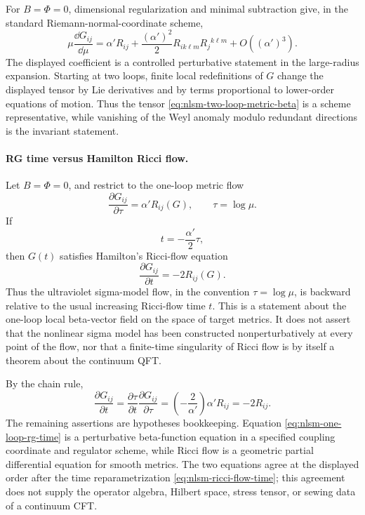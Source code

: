 \begin{controlledapproximation}
\label{capprox:nlsm-two-loop-metric-beta}
For \(B=\Phi=0\), dimensional regularization and minimal subtraction give,
in the standard Riemann-normal-coordinate scheme,
\begin{equation}
  \mu\frac{\dd G_{ij}}{\dd\mu}
  =
  \alpha' R_{ij}
  +
  \frac{(\alpha')^2}{2}
  R_{ik\ell m}R_j{}^{k\ell m}
  +
  O((\alpha')^3).
  \label{eq:nlsm-two-loop-metric-beta}
\end{equation}
The displayed coefficient is a controlled perturbative statement in the
large-radius expansion.  Starting at two loops, finite local redefinitions
of \(G\) change the displayed tensor by Lie derivatives and by terms
proportional to lower-order equations of motion.  Thus the tensor
\eqref{eq:nlsm-two-loop-metric-beta} is a scheme representative, while
vanishing of the Weyl anomaly modulo redundant directions is the invariant
statement.
\end{controlledapproximation}

\paragraph{RG time versus Hamilton Ricci flow.}
Let \(B=\Phi=0\), and restrict to the one-loop metric flow
\begin{equation}
  \frac{\partial G_{ij}}{\partial \tau}
  =
  \alpha'R_{ij}(G),
  \qquad
  \tau=\log\mu .
  \label{eq:nlsm-one-loop-rg-time}
\end{equation}
If
\begin{equation}
  t=-\frac{\alpha'}2\tau ,
  \label{eq:nlsm-ricci-flow-time}
\end{equation}
then \(G(t)\) satisfies Hamilton's Ricci-flow equation
\begin{equation}
  \frac{\partial G_{ij}}{\partial t}
  =
  -2R_{ij}(G).
  \label{eq:nlsm-hamilton-ricci-flow}
\end{equation}
Thus the ultraviolet sigma-model flow, in the convention
\(\tau=\log\mu\), is backward relative to the usual increasing Ricci-flow
time \(t\).  This is a statement about the one-loop local beta-vector field
on the space of target metrics.  It does not assert that the nonlinear
sigma model has been constructed nonperturbatively at every point of the
flow, nor that a finite-time singularity of Ricci flow is by itself a
theorem about the continuum QFT.

By the chain rule,
\[
  \frac{\partial G_{ij}}{\partial t}
  =
  \frac{\partial \tau}{\partial t}
  \frac{\partial G_{ij}}{\partial \tau}
  =
  \left(-\frac2{\alpha'}\right)\alpha'R_{ij}
  =
  -2R_{ij}.
\]
The remaining assertions are hypotheses bookkeeping.  Equation
\eqref{eq:nlsm-one-loop-rg-time} is a perturbative beta-function equation in
a specified coupling coordinate and regulator scheme, while Ricci flow is a
geometric partial differential equation for smooth metrics.  The two
equations agree at the displayed order after the time reparametrization
\eqref{eq:nlsm-ricci-flow-time}; this agreement does not supply the
operator algebra, Hilbert space, stress tensor, or sewing data of a
continuum CFT.

